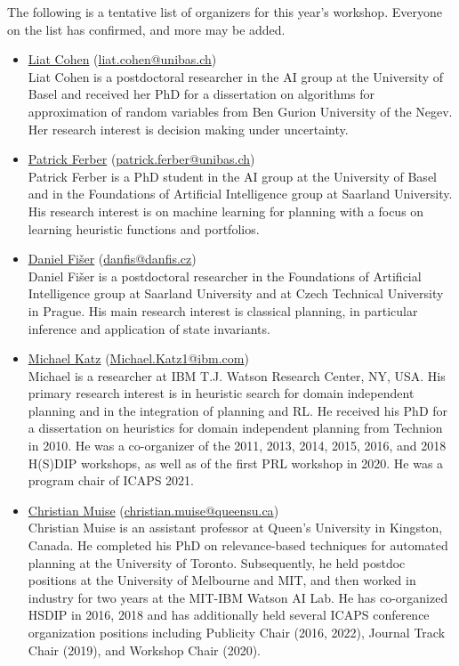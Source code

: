 \documentclass[10pt]{article}
\begin{document}
The following is a tentative list of organizers for this year's workshop.
Everyone on the list has confirmed, and more may be added.

\newcommand{\organizer}[4]{\href{#2}{#1} (\href{mailto:#3}{#3})\\{#4}}
\begin{itemize}

\item \organizer{Liat Cohen}{https://ai.dmi.unibas.ch/people/cohen/index.html}{liat.cohen@unibas.ch}
{Liat Cohen is a postdoctoral researcher in the AI group at the
 University of Basel and received her PhD for a dissertation on
 algorithms for approximation of random variables from Ben Gurion
 University of the Negev. Her research interest is decision making
 under uncertainty.}

\item \organizer{Patrick Ferber}{https://ai.dmi.unibas.ch/people/ferber/}{patrick.ferber@unibas.ch}
{Patrick Ferber is a PhD student in the AI group at the University of
Basel and in the Foundations of Artificial Intelligence group at
Saarland University. His research interest is on machine learning for
planning with a focus on learning heuristic functions and portfolios.}

\item \organizer{Daniel Fi\v{s}er}{https://www.danfis.cz}{danfis@danfis.cz}
{Daniel Fi\v{s}er is a postdoctoral researcher
in the Foundations of Artificial Intelligence group at Saarland University
and at Czech Technical University in Prague.
His main research interest is classical planning, in particular inference and
application of state invariants.}

\item \organizer{Michael Katz}{https://researcher.watson.ibm.com/researcher/view.php?person=ibm-Michael.Katz1}{Michael.Katz1@ibm.com}
Michael is a researcher at IBM T.J. Watson Research Center, NY, USA. His
primary research interest is in heuristic search for domain independent
planning and in the integration of planning and RL. He received his PhD for a
dissertation on heuristics for domain independent planning from Technion in
2010. He was a co-organizer of the 2011, 2013, 2014, 2015, 2016, and 2018
H(S)DIP workshops, as well as of the first PRL workshop in 2020. He was a
program chair of ICAPS 2021.

\item \organizer{Christian Muise}{http://www.haz.ca/}{christian.muise@queensu.ca}
{Christian Muise is an assistant professor at Queen's University in
Kingston, Canada. He completed his PhD on relevance-based techniques for
automated planning at the University of Toronto. Subsequently, he
held postdoc positions at the University of Melbourne and MIT,
and then worked in industry for two years at the MIT-IBM Watson AI Lab. He
has co-organized HSDIP in 2016, 2018 and has additionally held several
ICAPS conference organization positions including Publicity Chair (2016, 2022),
Journal Track Chair (2019), and Workshop Chair (2020).}



\end{itemize}
\end{document}
